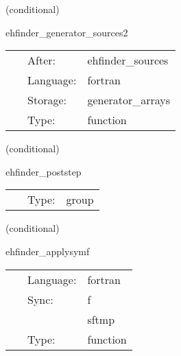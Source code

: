 \vspace{5mm}

   (conditional) 

\hspace{5mm} ehfinder\_generator\_sources2 

\hspace{5mm}{\it calculate the source terms2 for the generator evolution } 


\hspace{5mm}

 \begin{tabular*}{160mm}{cll} 
~ & After:  & ehfinder\_sources \\ 
~ & Language:  & fortran \\ 
~ & Storage:  & generator\_arrays \\ 
~ & Type:  & function \\ 
\end{tabular*} 


\vspace{5mm}

   (conditional) 

\hspace{5mm} ehfinder\_poststep 

\hspace{5mm}{\it schedule group for symmetry boundaries and syncing } 


\hspace{5mm}

 \begin{tabular*}{160mm}{cll} 
~ & Type:  & group \\ 
\end{tabular*} 


\vspace{5mm}

   (conditional) 

\hspace{5mm} ehfinder\_applysymf 

\hspace{5mm}{\it select f for boundary conditions } 


\hspace{5mm}

 \begin{tabular*}{160mm}{cll} 
~ & Language:  & fortran \\ 
~ & Sync:  & f \\ 
~& ~ &sftmp\\ 
~ & Type:  & function \\ 
\end{tabular*} 


